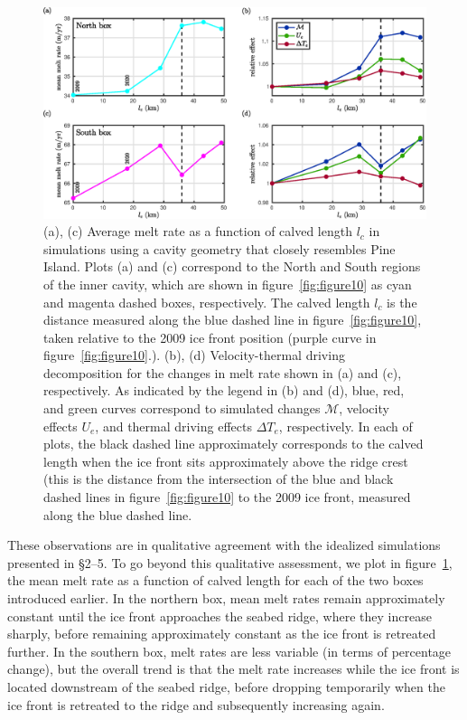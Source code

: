 \documentclass[draft]{agujournal2019}
\begin{document}
\begin{figure}
    \centering
    \includegraphics[width = \textwidth]{../make_figures/plots/figure12.eps}
    \caption{(a), (c) Average melt rate as a function of calved length $l_c$ in simulations using a cavity geometry that closely resembles Pine Island. Plots (a) and (c) correspond to the North and South regions of the inner cavity, which are shown in figure~\ref{fig:figure10} as cyan and magenta dashed boxes, respectively. The calved length $l_c$ is the distance measured along the blue dashed line in figure~\ref{fig:figure10}, taken relative to the 2009 ice front position (purple curve in figure~\ref{fig:figure10}.). (b), (d) Velocity-thermal driving decomposition for the changes in melt rate shown in (a) and (c), respectively. As indicated by the legend in (b) and (d), blue, red, and green curves correspond to simulated changes $\mathcal{M}$, velocity effects $U_e$, and thermal driving effects $\Delta T_e$, respectively. In each of  plots, the black dashed line approximately corresponds to the calved length when the ice front sits approximately above the ridge crest (this is the distance from the intersection of the blue and black dashed lines in figure~\ref{fig:figure10} to the 2009 ice front, measured along the blue dashed line.}\label{fig:figure12}
\end{figure}

 These observations are in qualitative agreement with the idealized simulations presented in \S2--5. To go beyond this qualitative assessment, we plot in figure~\ref{fig:figure12}, the mean melt rate as a function of calved length for each of the two boxes introduced earlier. In the northern box, mean melt rates remain approximately constant until the ice front approaches the seabed ridge, where they increase sharply, before remaining approximately constant as the ice front is retreated further. In the southern box, melt rates are less variable (in terms of percentage change), but the overall trend is that the melt rate increases while the ice front is located downstream of the seabed ridge, before dropping temporarily when the ice front is retreated to the ridge and subsequently increasing again. 
 
\end{document}
